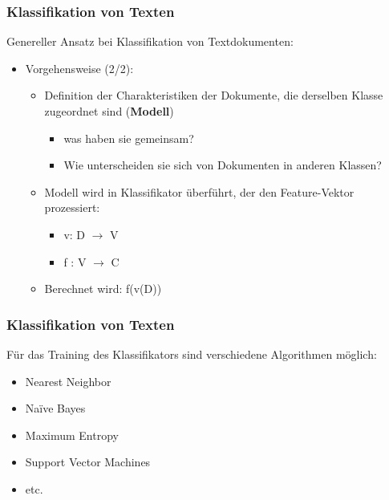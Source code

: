 \begin{frame}
    \frametitle{Klassifikation von Texten}

    Genereller Ansatz bei Klassifikation von Textdokumenten:
    \begin{itemize}
    \item Vorgehensweise (2/2):
    \begin{itemize}
    \item Definition der Charakteristiken der Dokumente, die derselben Klasse zugeordnet sind (\textbf{Modell})
    \begin{itemize}
    \item was haben sie gemeinsam?
    \item Wie unterscheiden sie sich von Dokumenten in anderen Klassen?
    \end{itemize}
    \item Modell wird in Klassifikator überführt, der den Feature-Vektor prozessiert:
    \begin{itemize}
    \item v: D $\rightarrow$ V
    \item f : V $\rightarrow$ C
    \end{itemize}
    \item Berechnet wird: f(v(D))
    \end{itemize}
    \end{itemize}
\end{frame}
    
    
\begin{frame}
    \frametitle{Klassifikation von Texten}
 
    Für das Training des Klassifikators sind verschiedene Algorithmen möglich:\\
    \begin{itemize}
    \item Nearest Neighbor
    \item Naïve Bayes
    \item Maximum Entropy 
    \item Support Vector Machines
    \item etc.
    \end{itemize}
    
\end{frame}
    
    
